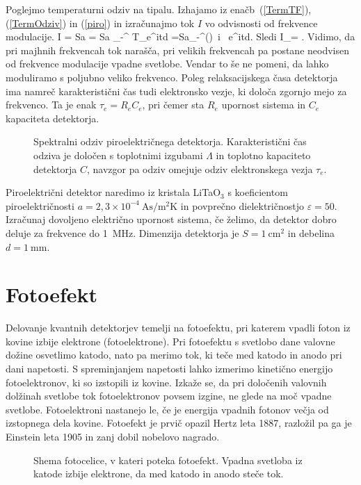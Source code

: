 Poglejmo temperaturni odziv na tipalu. Izhajamo iz enačb~(\ref{TermTF}), (\ref{TermOdziv}) in
(\ref{piro}) in izračunajmo tok $I$ vo odvisnosti od frekvence modulacije.
\beq
I = Sa  = Sa  \int_{-\infty}^{\infty} T_\omega e^{i\omega t}d\omega 
=Sa\int_{-\infty}^{\infty}\left(\right) \,i \omega\,
e^{i\omega t}d\omega.
\eeq
Sledi 
\beq
I_\omega = .
\eeq
Vidimo, da pri majhnih frekvencah tok narašča, pri velikih frekvencah pa postane neodvisen od
frekvence modulacije vpadne svetlobe. Vendar to še ne pomeni, da lahko moduliramo s poljubno 
veliko frekvenco. Poleg relaksacijskega časa detektorja ima namreč karakteristični čas tudi
elektronsko vezje, ki določa zgornjo mejo za frekvenco. Ta je enak $\tau_e = R_eC_e$, pri čemer
sta $R_e$ upornost sistema in $C_e$ kapaciteta detektorja. 
\begin{figure}[h]
\centering
\def\svgwidth{90truemm} 

\caption{Spektralni odziv piroelektričnega detektorja. Karakteristični čas odziva je 
določen s toplotnimi izgubami $\Lambda$ in toplotno kapaciteto detektorja $C$, navzgor
pa odziv omejuje odziv elektronskega vezja $\tau_e$.}
\label{fig:Piro}
\end{figure}

\begin{definition}
Piroelektrični detektor naredimo iz kristala LiTaO$_3$ s koeficientom piroelektričnosti
$a = 2,3 \times 10^{-4}~\si{\ampere \second /\metre^2 \kelvin}$ in povprečno 
dielektričnostjo $\varepsilon = 50$. Izračunaj dovoljeno električno upornost sistema, 
če želimo, da detektor dobro deluje za frekvence do 1~MHz. 
Dimenzija detektorja je $S = 1~\si{\centi\metre^2}$ in debelina $d = 1~\si{\milli\metre}$.
\end{definition}

\section{Fotoefekt}
Delovanje kvantnih detektorjev temelji na fotoefektu, pri katerem vpadli
foton iz kovine izbije elektrone (fotoelektrone). Pri fotoefektu s svetlobo
dane valovne dožine osvetlimo katodo, nato pa merimo tok, ki teče med katodo
in anodo pri dani napetosti. S spreminjanjem napetosti lahko izmerimo kinetično 
energijo fotoelektronov, ki so izstopili iz kovine. Izkaže se, da pri določenih 
valovnih dolžinah svetlobe tok fotoelektronov povsem izgine, ne glede na moč vpadne svetlobe.
Fotoelektroni nastanejo le, če je energija vpadnih fotonov večja od izstopnega
dela kovine. Fotoefekt je prvič opazil Hertz leta 1887, razložil pa ga
je Einstein leta 1905 in zanj dobil nobelovo nagrado. 
\begin{figure}[h]
\centering
\def\svgwidth{65truemm} 

\caption{Shema fotocelice, v kateri poteka fotoefekt. 
Vpadna svetloba iz katode izbije elektrone, da med katodo in anodo steče tok.}
\label{fig:Fotoefekt}
\end{figure}

